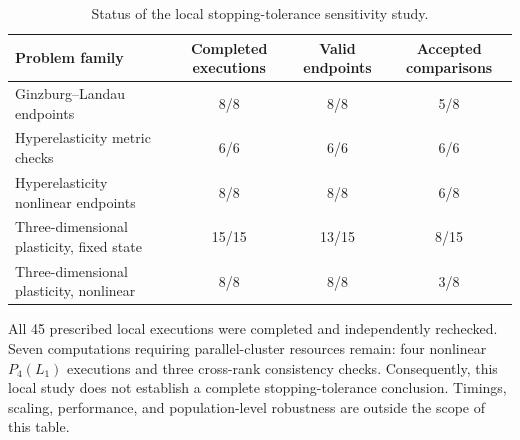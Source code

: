 \begin{table}[t]
  \centering
  \caption{Status of the local stopping-tolerance sensitivity study.}
  \label{tab:stopping-local-status}
  \begin{tabularx}{\linewidth}{L{1.70}C{0.75}C{0.75}C{0.75}}
    \toprule
    Problem family & Completed executions & Valid endpoints & Accepted comparisons \\
    \midrule
    Ginzburg--Landau endpoints & 8/8 & 8/8 & 5/8 \\
    Hyperelasticity metric checks & 6/6 & 6/6 & 6/6 \\
    Hyperelasticity nonlinear endpoints & 8/8 & 8/8 & 6/8 \\
    Three-dimensional plasticity, fixed state & 15/15 & 13/15 & 8/15 \\
    Three-dimensional plasticity, nonlinear & 8/8 & 8/8 & 3/8 \\
    \bottomrule
  \end{tabularx}
  \begin{minipage}{0.96\linewidth}\small
    All 45 prescribed local executions were completed and independently rechecked. Seven computations requiring parallel-cluster resources remain: four nonlinear $P_4(L_1)$ executions and three cross-rank consistency checks. Consequently, this local study does not establish a complete stopping-tolerance conclusion. Timings, scaling, performance, and population-level robustness are outside the scope of this table.
  \end{minipage}
\end{table}

